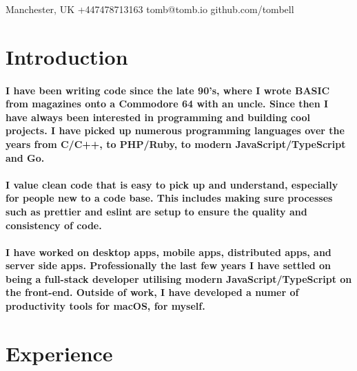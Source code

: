 \documentclass[a4paper]{article}
\author{Tom Bell}
\renewcommand{\maketitle}{
  \begin{center}
    \huge{\textbf\theauthor}
  \end{center}
}
\begin{document}
\maketitle

\begin{center}
  \raisebox{0\height}{\small\faMapMarker} Manchester, UK
  \hspace{1 cm}
  \raisebox{-0.1\height}{\small\faMobile} +447478713163
  \hspace{1 cm}
  \raisebox{-0.1\height}{\small\faEnvelope} tomb@tomb.io
  \hspace{1 cm}
  \raisebox{-0.1\height}{\small\faGithubAlt} github.com/tombell
\end{center}

\section{Introduction}
\paragraph{I have been writing code since the late 90's, where I wrote BASIC from magazines onto a Commodore 64 with an uncle. Since then I have always been interested in programming and building cool projects. I have picked up numerous programming languages over the years from C/C++, to PHP/Ruby, to modern JavaScript/TypeScript and Go.}

\paragraph{I value clean code that is easy to pick up and understand, especially for people new to a code base. This includes making sure processes such as prettier and eslint are setup to ensure the quality and consistency of code.}

\paragraph{I have worked on desktop apps, mobile apps, distributed apps, and server side apps. Professionally the last few years I have settled on being a full-stack developer utilising modern JavaScript/TypeScript on the front-end. Outside of work, I have developed a numer of productivity tools for macOS, for myself.}

\section{Experience}
\end{document}
